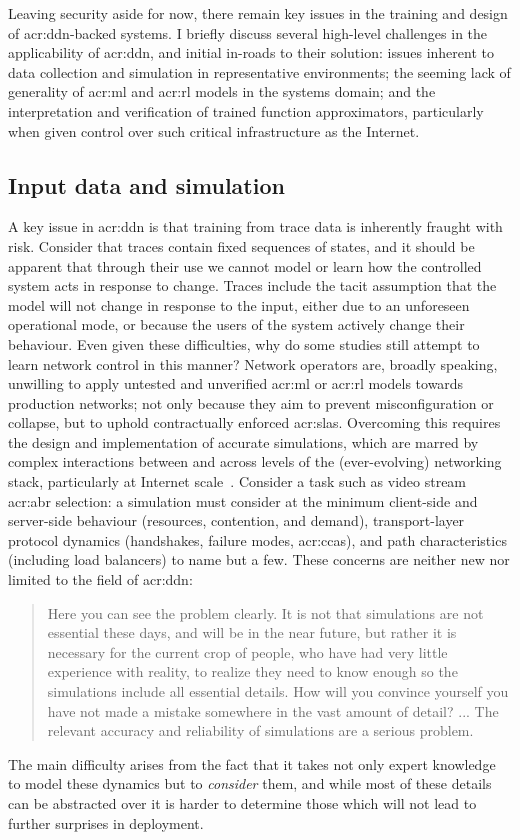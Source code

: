 Leaving security aside for now, there remain key issues in the training and design of \gls{acr:ddn}-backed systems.
I briefly discuss several high-level challenges in the applicability of \gls{acr:ddn}, and initial in-roads to their solution: issues inherent to data collection and simulation in representative environments; the seeming lack of generality of \gls{acr:ml} and \gls{acr:rl} models in the systems domain; and the interpretation and verification of trained function approximators, particularly when given control over such critical infrastructure as the Internet.

\subsection{Input data and simulation}
A key issue in \gls{acr:ddn} is that training from trace data is inherently fraught with risk.
Consider that traces contain fixed sequences of states, and it should be apparent that through their use we cannot model or learn how the controlled system acts in response to change.
Traces include the tacit assumption that the model will not change in response to the input, either due to an unforeseen operational mode, or because the users of the system actively change their behaviour.
Even given these difficulties, why do some studies still attempt to learn network control in this manner?
Network operators are, broadly speaking, unwilling to apply untested and unverified \gls{acr:ml} or \gls{acr:rl} models towards production networks; not only because they aim to prevent misconfiguration or collapse, but to uphold contractually enforced \glspl{acr:sla}.
Overcoming this requires the design and implementation of accurate simulations, which are marred by complex interactions between and across levels of the (ever-evolving) networking stack, particularly at Internet scale~\parencite{DBLP:journals/ton/X01c}.
Consider a task such as video stream \gls{acr:abr} selection: a simulation must consider at the minimum client-side and server-side behaviour (resources, contention, and demand), transport-layer protocol dynamics (handshakes, failure modes, \glspl{acr:cca}), and path characteristics (including load balancers) to name but a few.
These concerns are neither new nor limited to the field of \gls{acr:ddn}:
\begin{quotation}
\noindent
Here you can see the problem clearly.
It is not that simulations are not essential these days, and will be in the near future, but rather it is necessary for the current crop of people, who have had very little experience with reality, to realize they need to know enough so the simulations include all essential details.
How will you convince yourself you have not made a mistake somewhere in the vast amount of detail?
... The relevant accuracy and reliability of simulations are a serious problem.\\
\strut\hfill\parencite[p. 248]{hamming-art-of-scieng} 
\end{quotation}
The main difficulty arises from the fact that it takes not only expert knowledge to model these dynamics but to \emph{consider} them, and while most of these details can be abstracted over it is harder to determine those which will not lead to further surprises in deployment.

